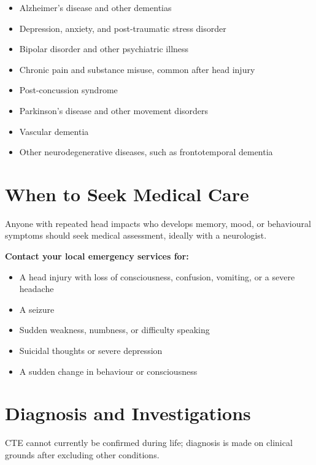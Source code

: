 \begin{itemize}
    \item Alzheimer's disease and other dementias
    \item Depression, anxiety, and post-traumatic stress disorder
    \item Bipolar disorder and other psychiatric illness
    \item Chronic pain and substance misuse, common after head injury
    \item Post-concussion syndrome
    \item Parkinson's disease and other movement disorders
    \item Vascular dementia
    \item Other neurodegenerative diseases, such as frontotemporal dementia
\end{itemize}

\section*{When to Seek Medical Care}
Anyone with repeated head impacts who develops memory, mood, or behavioural symptoms should seek medical assessment, ideally with a neurologist.

\textbf{Contact your local emergency services for:}
\begin{itemize}
    \item A head injury with loss of consciousness, confusion, vomiting, or a severe headache
    \item A seizure
    \item Sudden weakness, numbness, or difficulty speaking
    \item Suicidal thoughts or severe depression
    \item A sudden change in behaviour or consciousness
\end{itemize}

\section*{Diagnosis and Investigations}
CTE cannot currently be confirmed during life; diagnosis is made on clinical grounds after excluding other conditions.

